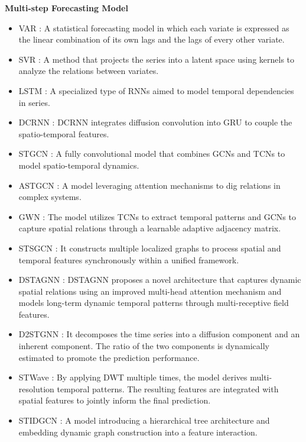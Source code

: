 \documentclass[final,12pt]{elsarticle}
\begin{document}
\noindent \textbf{Multi-step Forecasting Model}
\begin{itemize}

\item VAR \cite{zivot2006vector}: 
A statistical forecasting model in which each variate is expressed 
as the linear combination of its own lags 
and the lags of every other variate.

\item SVR \cite{drucker1996support}: 
A method that projects the series 
into a latent space using kernels 
to analyze the relations between variates.

\item LSTM \cite{graves2012long}: 
A specialized type of RNNs 
aimed to model temporal dependencies in series.

\item DCRNN \cite{li2017diffusion}: 
DCRNN integrates diffusion convolution into GRU 
to couple the spatio-temporal features.

\item STGCN \cite{yu2017spatio}: 
A fully convolutional model that combines GCNs 
and TCNs to model spatio-temporal dynamics.

\item ASTGCN \cite{guo2019attention}: 
A model leveraging attention mechanisms 
to dig relations in complex systems.

\item GWN \cite{wu2019graph}: 
The model utilizes TCNs to extract temporal patterns and 
GCNs to capture spatial relations 
through a learnable adaptive adjacency matrix.

\item STSGCN \cite{song2020spatial}: 
It constructs multiple localized graphs 
to process spatial and temporal features 
synchronously within a unified framework.

\item DSTAGNN \cite{lan2022dstagnn}: 
DSTAGNN proposes a novel architecture that captures dynamic spatial relations 
using an improved multi-head attention mechanism and 
models long-term dynamic temporal patterns 
through multi-receptive field features.

\item D2STGNN \cite{shao2022decoupled}: 
It decomposes the time series into a diffusion component and an inherent component.
The ratio of the two components is dynamically estimated 
to promote the prediction performance.

\item STWave \cite{fang2023spatio}: 
By applying DWT multiple times, 
the model derives multi-resolution temporal patterns.
The resulting features are integrated 
with spatial features to jointly inform the final prediction.

\item STIDGCN \cite{liu2024spatial}: 
A model introducing a hierarchical tree architecture 
and embedding dynamic graph construction 
into a feature interaction.

\end{itemize}
\end{document}
